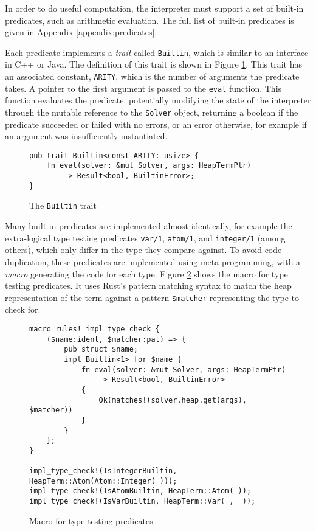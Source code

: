 \label{sec:builtins}

In order to do useful computation, the interpreter must support a set of built-in predicates, such as arithmetic evaluation. The full list of built-in predicates is given in Appendix \ref{appendix:predicates}.

Each predicate implements a \emph{trait} called \texttt{Builtin}, which is similar to an interface in C++ or Java. The definition of this trait is shown in Figure \ref{fig:builtin-trait}. This trait has an associated constant, \texttt{ARITY}, which is the number of arguments the predicate takes. A pointer to the first argument is passed to the \texttt{eval} function. This function evaluates the predicate, potentially modifying the state of the interpreter through the mutable reference to the \texttt{Solver} object, returning a boolean if the predicate succeeded or failed with no errors, or an error otherwise, for example if an argument was insufficiently instantiated.

\begin{figure}[H]
\centering
\begin{verbatim}
pub trait Builtin<const ARITY: usize> {
    fn eval(solver: &mut Solver, args: HeapTermPtr)
        -> Result<bool, BuiltinError>;
}
\end{verbatim}
\caption{The \texttt{Builtin} trait}
\label{fig:builtin-trait}
\end{figure}

Many built-in predicates are implemented almost identically, for example the extra-logical type testing predicates \texttt{var/1}, \texttt{atom/1}, and \texttt{integer/1} (among others), which only differ in the type they compare against. To avoid code duplication, these predicates are implemented using meta-programming, with a \emph{macro} generating the code for each type. Figure \ref{fig:builtin-macro} shows the macro for type testing predicates. It uses Rust's pattern matching syntax to match the heap representation of the term against a pattern \texttt{\$matcher} representing the type to check for.

\begin{figure}[H]
\centering
\begin{verbatim}
macro_rules! impl_type_check {
    ($name:ident, $matcher:pat) => {
        pub struct $name;
        impl Builtin<1> for $name {
            fn eval(solver: &mut Solver, args: HeapTermPtr)
                -> Result<bool, BuiltinError>
            {
                Ok(matches!(solver.heap.get(args), $matcher))
            }
        }
    };
}

impl_type_check!(IsIntegerBuiltin, HeapTerm::Atom(Atom::Integer(_)));
impl_type_check!(IsAtomBuiltin, HeapTerm::Atom(_));
impl_type_check!(IsVarBuiltin, HeapTerm::Var(_, _));
\end{verbatim}
\caption{Macro for type testing predicates}
\label{fig:builtin-macro}
\end{figure}

